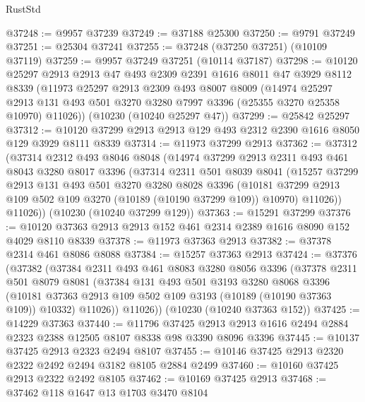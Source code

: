 \begin{lexlean}{RustStd}
\begin{coremodule}
@37248 := @9957 @37239
@37249 := @37188 @25300
@37250 := @9791 @37249
@37251 := @25304 @37241
@37255 := @37248 (@37250 @37251) (@10109 @37119)
@37259 := @9957 @37249 @37251 (@10114 @37187)
@37298 := @10120
    @25297
    @2913
    @2913
    @47
    @493
    @2309
    @2391
    @1616
    @8011
    @47
    @3929
    @8112
    @8339
    (@11973
      @25297
      @2913
      @2309
      @493
      @8007
      @8009
      (@14974
        @25297
        @2913
        @131
        @493
        @501
        @3270
        @3280
        @7997
        @3396
        (@25355 @3270 @25358 @10970)
        @11026))
    (@10230 (@10240 @25297 @47))
@37299 := @25842 @25297
@37312 := @10120 @37299 @2913 @2913 @129 @493 @2312 @2390 @1616 @8050 @129 @3929 @8111 @8339
@37314 := @11973 @37299 @2913
@37362 := @37312
    (@37314
      @2312
      @493
      @8046
      @8048
      (@14974
        @37299
        @2913
        @2311
        @493
        @461
        @8043
        @3280
        @8017
        @3396
        (@37314
          @2311
          @501
          @8039
          @8041
          (@15257
            @37299
            @2913
            @131
            @493
            @501
            @3270
            @3280
            @8028
            @3396
            (@10181 @37299 @2913 @109 @502 @109 @3270 (@10189 (@10190 @37299 @109)) @10970)
            @11026))
        @11026))
    (@10230 (@10240 @37299 @129))
@37363 := @15291 @37299
@37376 := @10120 @37363 @2913 @2913 @152 @461 @2314 @2389 @1616 @8090 @152 @4029 @8110 @8339
@37378 := @11973 @37363 @2913
@37382 := @37378 @2314 @461 @8086 @8088
@37384 := @15257 @37363 @2913
@37424 := @37376
    (@37382
      (@37384
        @2311
        @493
        @461
        @8083
        @3280
        @8056
        @3396
        (@37378
          @2311
          @501
          @8079
          @8081
          (@37384
            @131
            @493
            @501
            @3193
            @3280
            @8068
            @3396
            (@10181 @37363 @2913 @109 @502 @109 @3193 (@10189 (@10190 @37363 @109)) @10332)
            @11026))
        @11026))
    (@10230 (@10240 @37363 @152))
@37425 := @14229 @37363
@37440 := @11796
    @37425
    @2913
    @2913
    @1616
    @2494
    @2884
    @2323
    @2388
    @12505
    @8107
    @8338
    @98
    @3390
    @8096
    @3396
@37445 := @10137 @37425 @2913 @2323 @2494 @8107
@37455 := @10146 @37425 @2913 @2320 @2322 @2492 @2494 @3182 @8105 @2884 @2499
@37460 := @10160 @37425 @2913 @2322 @2492 @8105
@37462 := @10169 @37425 @2913
@37468 := @37462 @118 @1647 @13 @1703 @3470 @8104

\end{coremodule}
\end{lexlean}
